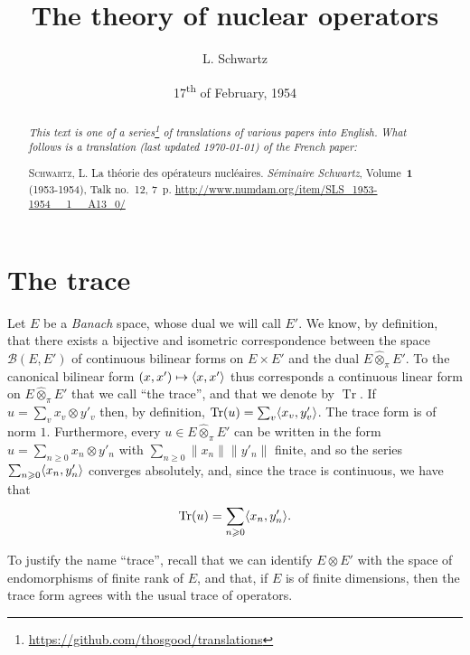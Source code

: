 \documentclass{article}
\theoremstyle{plain}
\theoremstyle{definition}
\newcommand{\BB}{\mathcal{B}}
\newcommand{\cprojotimes}{\widehat{\otimes}_\pi}
\newcommand{\tr}{\operatorname{Tr}}
\renewcommand{\geq}{\geqslant}
\renewcommand{\rangle}{\rotatebox[origin=c]{180}{$\langle$}}
\newcommand{\oldpage}[1]{\marginpar{\footnotesize$\Big\vert$ \textit{p.~#1}}}
\begin{document}
\renewcommand{\abstractname}{Translator's note.}

\title{The theory of nuclear operators}
\author{L. Schwartz}
\date{17\textsuperscript{th} of February, 1954}
\maketitle

\begin{abstract}
  \renewcommand*{\thefootnote}{\fnsymbol{footnote}}
  \emph{This text is one of a series\footnote{\url{https://github.com/thosgood/translations}} of translations of various papers into English.}
  \emph{What follows is a translation (last updated \today) of the French paper:}

  \medskip\noindent
  \textsc{Schwartz, L}. La théorie des opérateurs nucléaires. \emph{Séminaire Schwartz}, Volume~\textbf{1} (1953-1954), Talk no.~12, 7~p. {\footnotesize\url{http://www.numdam.org/item/SLS_1953-1954__1__A13_0/}}
\end{abstract}

\tableofcontents



\section{The trace}
\label{section1}

\oldpage{1}

Let $E$ be a \emph{Banach} space, whose dual we will call $E'$.
We know, by definition, that there exists a bijective and isometric correspondence between the space $\BB(E,E')$ of continuous bilinear forms on $E\times E'$ and the dual $E\cprojotimes E'$.
To the canonical bilinear form $(x,x')\mapsto\langle x,x'\rangle$ thus corresponds a continuous linear form on $E\cprojotimes E'$ that we call ``the trace'', and that we denote by $\tr$.
If $u=\sum_v x_v\otimes y'_v$ then, by definition, $\tr(u)=\sum_v\langle x_v,y'_v\rangle$.
The trace form is of norm $1$.
Furthermore, every $u\in E\cprojotimes E'$ can be written in the form $u=\sum_{n\geq0}x_n\otimes y'_n$ with $\sum_{n\geq0}\|x_n\|\|y'_n\|$ finite, and so the series $\sum_{n\geq0}\langle x_n,y'_n\rangle$ converges absolutely, and, since the trace is continuous, we have that
\[
  \tr(u) = \sum_{n\geq0} \langle x_n, y'_n \rangle.
\]

To justify the name ``trace'', recall that we can identify $E\otimes E'$ with the space of endomorphisms of finite rank of $E$, and that, if $E$ is of finite dimensions, then the trace form agrees with the usual trace of operators.
\end{document}
